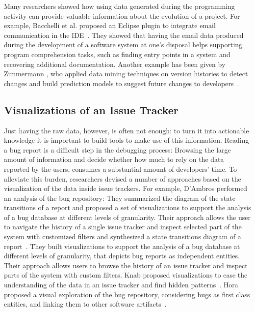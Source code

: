 
Many researchers showed how using data generated during the programming activity can provide valuable information about the evolution of a project.
For example, Bacchelli et al. proposed an Eclipse plugin to integrate email communication in the IDE~\cite{Bacc2011a}.
They showed that having the email data produced during the development of a software system at one's disposal helps supporting program comprehension tasks, such as finding entry points in a system and recovering additional documentation.
Another example has been given by Zimmermann \etal, who applied data mining techniques on version histories to detect changes and build prediction models to suggest future changes to developers~\cite{Zimm2004a}.


\subsection{Visualizations of an Issue Tracker}

Just having the raw data, however, is often not enough: to turn it into actionable knowledge it is important to build tools to make use of this information.
Reading a bug report is a difficult step in the debugging process: Browsing the large amount of information and decide whether how much to rely on the data reported by the users, consumes a substantial amount of developers' time.
To alleviate this burden, researchers devised a number of approaches based on the visualization of the data inside issue trackers.
For example, D'Ambros \etal performed an analysis of the \bzilla bug repository: They summarized the diagram of the state transitions of a report and proposed a set of visualizations to support the analysis of a bug database at different levels of granularity.
Their approach allows the user to navigate the history of a single issue tracker and inspect selected part of the system with customized filters and synthesized a state transitions diagram of a report~\cite{DAmb2007b}.
They built visualizations to support the analysis of a bug database at different levels of granularity, that depicts bug reports as independent entities.
Their approach allows users to browse the history of an issue tracker and inspect parts of the system with custom filters.
Knab \etal proposed visualizations to ease the understanding of the data in an issue tracker and find hidden patterns~\cite{Knab2009a,Knab2010a}.
Hora \etal proposed a visual exploration of the bug repository, considering bugs as first class entities, and linking them to other software artifacts~\cite{Hora2012a}.

